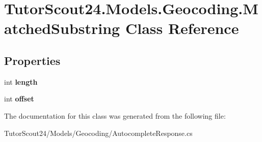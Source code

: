 \hypertarget{class_tutor_scout24_1_1_models_1_1_geocoding_1_1_matched_substring}{}\section{Tutor\+Scout24.\+Models.\+Geocoding.\+Matched\+Substring Class Reference}
\label{class_tutor_scout24_1_1_models_1_1_geocoding_1_1_matched_substring}
\subsection*{Properties}
\begin{DoxyCompactItemize}
\item 
\mbox{\label{class_tutor_scout24_1_1_models_1_1_geocoding_1_1_matched_substring_a4fb6974c310cc22bd749b3632e058aaf}} 
int {\bfseries length}
\item 
\mbox{\label{class_tutor_scout24_1_1_models_1_1_geocoding_1_1_matched_substring_a655a8ce3701de01040267ed389e2504d}} 
int {\bfseries offset}
\end{DoxyCompactItemize}


The documentation for this class was generated from the following file\+:\begin{DoxyCompactItemize}
\item 
Tutor\+Scout24/\+Models/\+Geocoding/Autocomplete\+Response.\+cs\end{DoxyCompactItemize}
